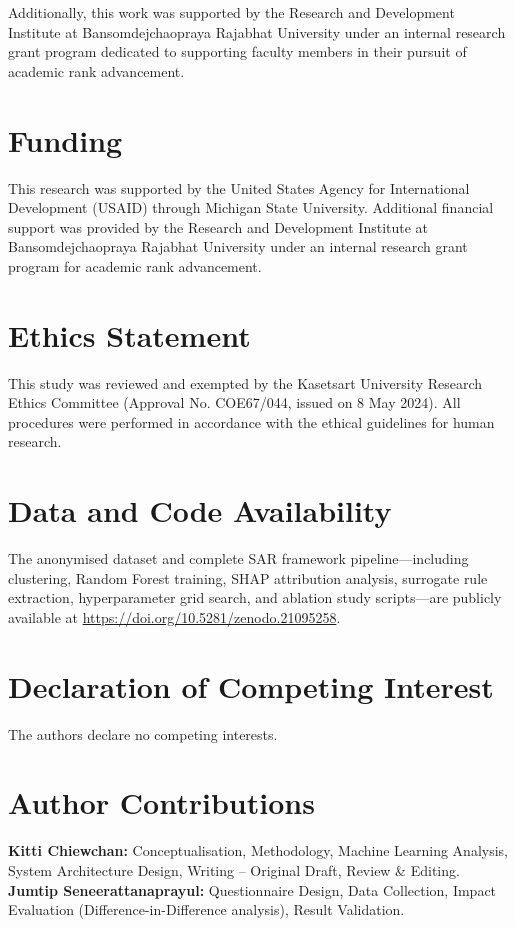 \documentclass[fleqn,10pt,lineno]{wlpeerj}
\begin{document}
Additionally, this work was supported by the Research and Development Institute at Bansomdejchaopraya Rajabhat University under an internal research grant program dedicated to supporting faculty members in their pursuit of academic rank advancement.

\section*{Funding}
This research was supported by the United States Agency for International Development (USAID) through Michigan State University. Additional financial support was provided by the Research and Development Institute at Bansomdejchaopraya Rajabhat University under an internal research grant program for academic rank advancement.

\section*{Ethics Statement}
This study was reviewed and exempted by the Kasetsart University Research Ethics Committee (Approval No. COE67/044, issued on 8 May 2024). All procedures were performed in accordance with the ethical guidelines for human research.

\section*{Data and Code Availability}
The anonymised dataset and complete SAR framework pipeline---including 
clustering, Random Forest training, SHAP attribution analysis, 
surrogate rule extraction, hyperparameter grid search, and ablation 
study scripts---are publicly available at 
\url{https://doi.org/10.5281/zenodo.21095258}.

\section*{Declaration of Competing Interest}
The authors declare no competing interests.

\section*{Author Contributions}
\textbf{Kitti Chiewchan:} Conceptualisation, Methodology, Machine Learning Analysis, System Architecture Design, Writing -- Original Draft, Review \& Editing. \\
\textbf{Jumtip Seneerattanaprayul:} Questionnaire Design, Data Collection, Impact Evaluation (Difference-in-Difference analysis), Result Validation.
\end{document}
